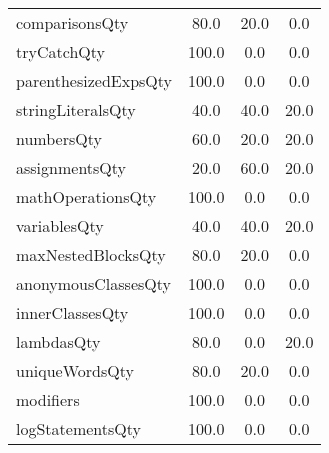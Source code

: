 \begin{tabular}{lccc}
comparisonsQty & 80.0 & 20.0 & 0.0 \\
tryCatchQty & 100.0 & 0.0 & 0.0 \\
parenthesizedExpsQty & 100.0 & 0.0 & 0.0 \\
stringLiteralsQty & 40.0 & 40.0 & 20.0 \\
numbersQty & 60.0 & 20.0 & 20.0 \\
assignmentsQty & 20.0 & 60.0 & 20.0 \\
mathOperationsQty & 100.0 & 0.0 & 0.0 \\
variablesQty & 40.0 & 40.0 & 20.0 \\
maxNestedBlocksQty & 80.0 & 20.0 & 0.0 \\
anonymousClassesQty & 100.0 & 0.0 & 0.0 \\
innerClassesQty & 100.0 & 0.0 & 0.0 \\
lambdasQty & 80.0 & 0.0 & 20.0 \\
uniqueWordsQty & 80.0 & 20.0 & 0.0 \\
modifiers & 100.0 & 0.0 & 0.0 \\
logStatementsQty & 100.0 & 0.0 & 0.0 \\
\bottomrule
              \end{tabular}
            